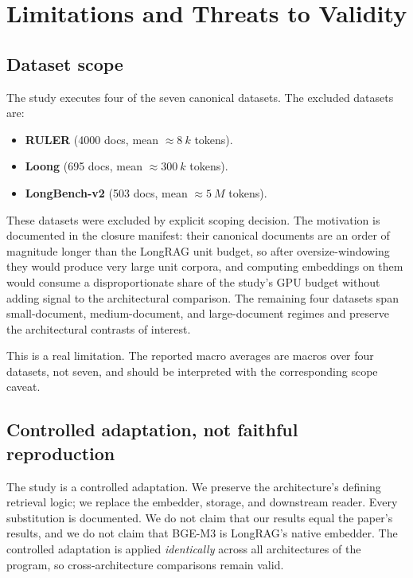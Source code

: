 \documentclass[11pt,a4paper]{article}
\begin{document}
\section{Limitations and Threats to Validity}\label{sec:limitations}

\subsection{Dataset scope}
The study executes four of the seven canonical datasets. The
excluded datasets are:

\begin{itemize}[leftmargin=1.5em,itemsep=0.15em]
  \item \textbf{RULER} (\num{4000} docs, mean $\approx \SI{8}{k}$
    tokens).
  \item \textbf{Loong} (\num{695} docs, mean $\approx \SI{300}{k}$
    tokens).
  \item \textbf{LongBench-v2} (\num{503} docs, mean $\approx
    \SI{5}{M}$ tokens).
\end{itemize}

These datasets were excluded by explicit scoping decision. The
motivation is documented in the closure manifest: their canonical
documents are an order of magnitude longer than the LongRAG unit
budget, so after oversize-windowing they would produce very large
unit corpora, and computing embeddings on them would consume a
disproportionate share of the study's GPU budget without adding
signal to the architectural comparison. The remaining four datasets
span small-document, medium-document, and large-document regimes and
preserve the architectural contrasts of interest.

This is a real limitation. The reported macro averages are
macros over four datasets, not seven, and should be interpreted
with the corresponding scope caveat.

\subsection{Controlled adaptation, not faithful reproduction}
The study is a controlled adaptation. We preserve the architecture's
defining retrieval logic; we replace the embedder, storage, and
downstream reader. Every substitution is documented. We do not claim
that our results equal the paper's results, and we do not claim
that BGE-M3 is LongRAG's native embedder. The controlled adaptation
is applied \emph{identically} across all architectures of the
program, so cross-architecture comparisons remain valid.
\end{document}
